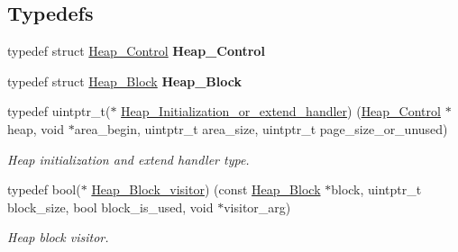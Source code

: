 \subsection*{Typedefs}
\begin{DoxyCompactItemize}
\item 
\mbox{\label{group__RTEMSScoreHeap_ga3efd1e74160003a73c2e4d875f0eee4e}} 
typedef struct \mbox{\hyperlink{structHeap__Control}{Heap\+\_\+\+Control}} {\bfseries Heap\+\_\+\+Control}
\item 
\mbox{\label{group__RTEMSScoreHeap_ga218cc5fc882bff932b75fc65341a0bbe}} 
typedef struct \mbox{\hyperlink{structHeap__Block}{Heap\+\_\+\+Block}} {\bfseries Heap\+\_\+\+Block}
\item 
typedef uintptr\+\_\+t($\ast$ \mbox{\hyperlink{group__RTEMSScoreHeap_ga8953b692d39ca1c8a2780e9e8e2d9b1f}{Heap\+\_\+\+Initialization\+\_\+or\+\_\+extend\+\_\+handler}}) (\mbox{\hyperlink{structHeap__Control}{Heap\+\_\+\+Control}} $\ast$heap, void $\ast$area\+\_\+begin, uintptr\+\_\+t area\+\_\+size, uintptr\+\_\+t page\+\_\+size\+\_\+or\+\_\+unused)
\begin{DoxyCompactList}\small\item\em Heap initialization and extend handler type. \end{DoxyCompactList}\item 
typedef bool($\ast$ \mbox{\hyperlink{group__RTEMSScoreHeap_gab5fc026bfabc31c620545e574d579b64}{Heap\+\_\+\+Block\+\_\+visitor}}) (const \mbox{\hyperlink{structHeap__Block}{Heap\+\_\+\+Block}} $\ast$block, uintptr\+\_\+t block\+\_\+size, bool block\+\_\+is\+\_\+used, void $\ast$visitor\+\_\+arg)
\begin{DoxyCompactList}\small\item\em Heap block visitor. \end{DoxyCompactList}\end{DoxyCompactItemize}
